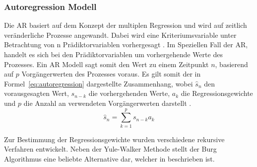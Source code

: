 \subsubsection{Autoregression Modell}
Die \ac{AR} basiert auf dem Konzept der multiplen Regression und wird auf zeitlich veränderliche Prozesse angewandt.
Dabei wird eine Kriteriumsvariable unter Betrachtung von n Prädiktorvariablen vorhergesagt \autocite[vgl.][S. 37-38]{canela_multiple_2019}.
Im Speziellen Fall der \ac{AR}, handelt es sich bei den Prädiktorvariablen um vorhergehende Werte des Prozesses.
Ein \ac{AR} Modell sagt somit den Wert zu einem Zeitpunkt $n$, basierend auf $p$ Vorgängerwerten des Prozesses voraus.
Es gilt somit der in Formel~\ref{eq:autoregression} dargestellte Zusammenhang, wobei $\hat{s}_n$ den vorausgesagten Wert, $s_{n-k}$ die vorhergehenden Werte, $a_{k}$ die Regressionsgewichte und $p$ die Anzahl an verwendeten Vorgängerwerten darstellt \autocite[][S. 1304]{atal_effectiveness_1974}.
\begin{equation}
  \hat{s}_{n} = \sum_{k=1}^{p} s_{n-k}a_{k}
  \label{eq:autoregression}
\end{equation}

Zur Bestimmung der Regressionsgewichte wurden verschiedene rekursive Verfahren entwickelt.
Neben der Yule-Walker Methode stellt der Burg Algorithmus eine beliebte Alternative dar, welcher in \citeauthor[][S. 443]{marple_new_1980} beschrieben ist.

